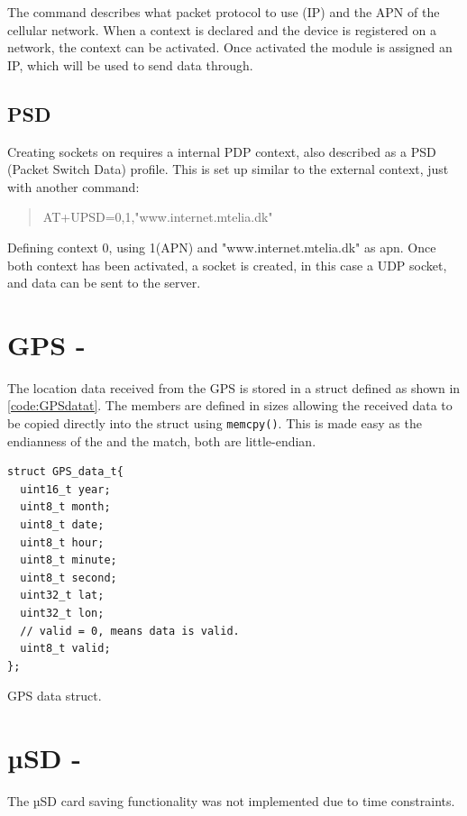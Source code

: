 The command describes what packet protocol to use (IP) and the APN of the cellular network.
When a context is declared and the device is registered on a network, the context can be activated.
Once activated the module is assigned an IP, which will be used to send data through.

\subsection{PSD}
Creating sockets on \SARA requires a internal PDP context, also described as a PSD (Packet Switch Data) profile.
This is set up similar to the external context, just with another command:
\begin{quote}
	AT+UPSD=0,1,"www.internet.mtelia.dk"
\end{quote}
Defining context 0, using 1(APN) and "www.internet.mtelia.dk" as apn. Once both context has been activated, a socket is created, in this case a UDP socket, and data can be sent to the server.

\section{GPS - \GPS}
\label{sec:impl:gps}
The location data received from the \GPS GPS is stored in a struct defined as shown in \cref{code:GPSdatat}.
The members are defined in sizes allowing the received data to be copied directly into the struct using \texttt{memcpy()}.
This is made easy as the endianness of the \GPS and the \SAMD match, both are little-endian.

\begin{listing}
	\begin{verbatim}
struct GPS_data_t{
  uint16_t year;
  uint8_t month;
  uint8_t date;
  uint8_t hour;
  uint8_t minute;
  uint8_t second;
  uint32_t lat;
  uint32_t lon;
  // valid = 0, means data is valid.
  uint8_t valid;
};
	\end{verbatim}
	\caption{GPS data struct.}
	\label{code:GPSdatat}
\end{listing}

\section{µSD - \SDsock}
The µSD card saving functionality was not implemented due to time constraints.

\FloatBarrier
